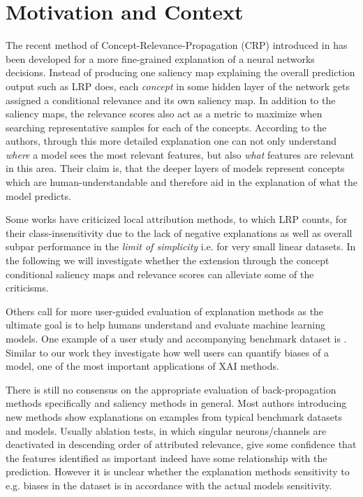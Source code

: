 \section{Motivation and Context}

The recent method of Concept-Relevance-Propagation (CRP) introduced in \cite{Achtibat2022} has been developed for a more fine-grained explanation of a neural networks decisions. Instead of producing one saliency map explaining the overall prediction output such as LRP \cite{Bach2015} does, each \textit{concept} in some hidden layer of the network gets assigned a conditional relevance and its own saliency map. In addition to the saliency maps, the relevance scores also act as a metric to maximize when searching representative samples for each of the concepts. According to the authors, through this more detailed explanation one can not only understand \textit{where} a model sees the most relevant features, but also \textit{what} features are relevant in this area. Their claim is, that the deeper layers of models represent concepts which are human-understandable and therefore aid in the explanation of what the model predicts. 

Some works have criticized local attribution methods, to which LRP counts, for their class-insensitivity due to the lack of negative explanations as well as overall subpar performance in the \textit{limit of simplicity} i.e. for very small linear datasets. 
In the following we will investigate whether the extension through the concept conditional saliency maps and relevance scores can alleviate some of the criticisms.

Others call for more user-guided evaluation of explanation methods as the ultimate goal is to help humans understand and evaluate machine learning models. One example of a user study and accompanying benchmark dataset is \cite{Sixt2022}. Similar to our work they investigate how well users can quantify biases of a model, one of the most important applications of XAI methods. 

There is still no consensus on the appropriate evaluation of back-propagation methods specifically and saliency methods in general. Most authors introducing new methods show explanations on examples from typical benchmark datasets and models. Usually ablation tests, in which singular neurons/channels are deactivated in descending order of attributed relevance, give some confidence that the features identified as important indeed have some relationship with the prediction. However it is unclear whether the explanation methods sensitivity to e.g. biases in the dataset is in accordance with the actual models sensitivity. 

